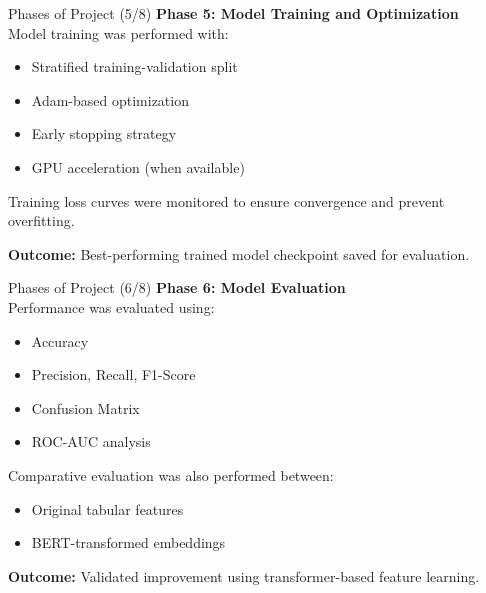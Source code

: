 \documentclass[aspectratio=169,xcolor=dvipsnames]{beamer}
\begin{document}
\begin{frame}{Phases of Project (5/8)}
\textbf{Phase 5: Model Training and Optimization} \\[6pt]

Model training was performed with:

\begin{itemize}
    \item Stratified training-validation split
    \item Adam-based optimization
    \item Early stopping strategy
    \item GPU acceleration (when available)
\end{itemize}

Training loss curves were monitored to ensure convergence and prevent overfitting.

\vspace{0.2cm}
\textbf{Outcome:}
Best-performing trained model checkpoint saved for evaluation.
\end{frame}


\begin{frame}{Phases of Project (6/8)}
\textbf{Phase 6: Model Evaluation} \\[6pt]

Performance was evaluated using:

\begin{itemize}
    \item Accuracy
    \item Precision, Recall, F1-Score
    \item Confusion Matrix
    \item ROC-AUC analysis
\end{itemize}

Comparative evaluation was also performed between:

\begin{itemize}
    \item Original tabular features
    \item BERT-transformed embeddings
\end{itemize}

\vspace{0.2cm}
\textbf{Outcome:}
Validated improvement using transformer-based feature learning.
\end{frame}


\end{document}

